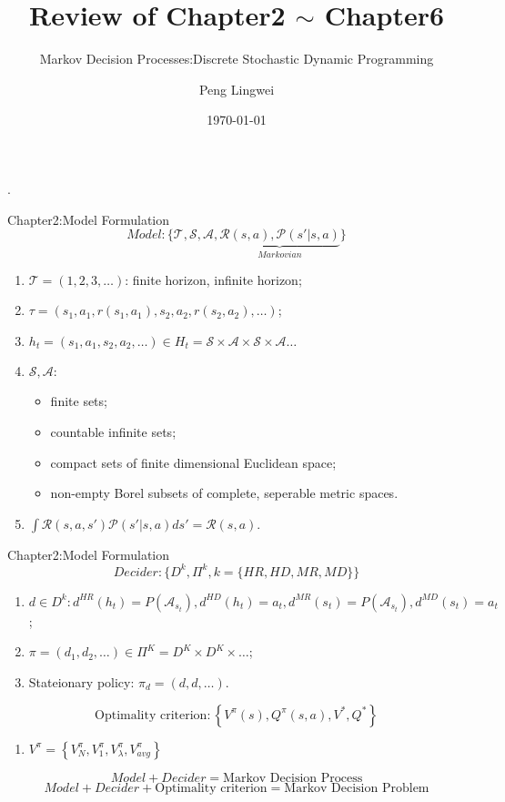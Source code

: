 \documentclass{beamer}
\begin{document}
\begin{frame}
    \title{Review of Chapter2 $ \sim $ Chapter6}
    \subtitle{Markov Decision Processes:Discrete Stochastic Dynamic Programming}
    \author{Peng Lingwei}
    \date{\today}
    \titlepage.
\end{frame}

\begin{frame}{Chapter2:Model Formulation}
    \[
        Model: \{\mathcal{T}, \mathcal{S}, \mathcal{A}, \underbrace{\mathcal{R}(s, a), \mathcal{P}(s'|s, a)}_{Markovian}\}
    \]
    
    \begin{enumerate}
        \item $ \mathcal{T} = (1, 2, 3, \ldots) $: finite horizon, infinite horizon;
        \item $ \tau = (s_1, a_1, r(s_1, a_1), s_2, a_2, r(s_2,a_2), \ldots ) $;
        \item $ h_t = (s_1, a_1, s_2, a_2, \ldots) \in H_t = \mathcal{S \times A \times S \times A} \ldots$
        \item $ \mathcal{S, A}$:
            \begin{itemize}
                \item finite sets;
                \item countable infinite sets;
                \item compact sets of finite dimensional Euclidean space;
                \item non-empty Borel subsets of complete, seperable metric spaces.
            \end{itemize}
        \item $ \int \mathcal{R}(s, a, s') \mathcal{P}(s' | s, a) ds' = \mathcal{R}(s, a)$.
    \end{enumerate}
\end{frame}
\begin{frame}{Chapter2:Model Formulation}
    \[
        Decider: \{D^k, \Pi^k, k = \{HR, HD, MR, MD\}\}
    \]
    \begin{enumerate}
        \item $ d \in D^k: d^{HR}(h_t) = P(\mathcal{A}_{s_t}), d^{HD}(h_t) = a_t, d^{MR}(s_t) = P(\mathcal{A}_{s_t}), d^{MD}(s_t) = a_t $;
        \item $ \pi = (d_1, d_2, \ldots)\in \Pi^K = D^K \times D^K \times \ldots $;
        \item Stateionary policy: $ \pi_d = (d, d, \ldots) $.
    \end{enumerate}

    \[
        \text{Optimality criterion}: \left\{ V^\pi(s), Q^\pi(s, a), V^*, Q^* \right\}
    \]
    \begin{enumerate}
        \item $ V^\pi = \left\{ V^\pi_N, V^\pi_1, V^\pi_\lambda, V^\pi_{avg} \right\} $
    \end{enumerate}

    \[
        Model + Decider = \text{Markov Decision Process}
    \]
    \[
        Model + Decider + \text{Optimality criterion} = \text{Markov Decision Problem}
    \]
\end{frame}
\end{document}
